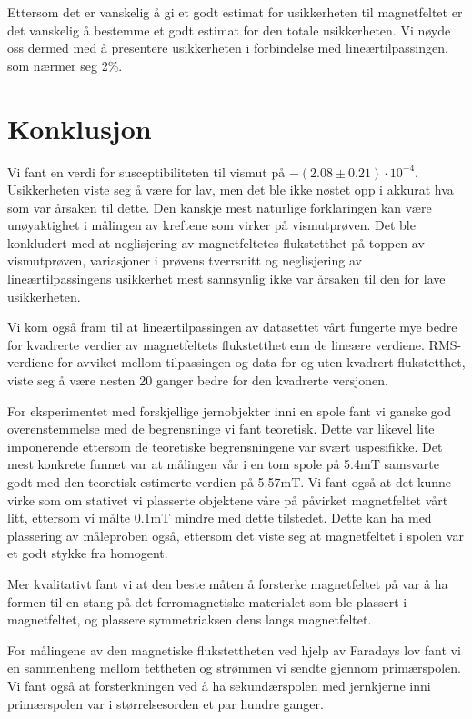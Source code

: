 \documentclass[a4paper,11pt, twocolumn]{article}
\begin{document}
Ettersom det er vanskelig å gi et godt estimat for usikkerheten til magnetfeltet er det vanskelig å bestemme et godt estimat for den totale usikkerheten. Vi nøyde oss dermed med å presentere usikkerheten i forbindelse med lineærtilpassingen, som nærmer seg 2\%. 

\section{Konklusjon}
Vi fant en verdi for susceptibiliteten til vismut på $-(2.08\pm0.21)\cdot10^{-4}$. Usikkerheten viste seg å være for lav, men det ble ikke nøstet opp i akkurat hva som var årsaken til dette. Den kanskje mest naturlige forklaringen kan være unøyaktighet i målingen av kreftene som virker på vismutprøven. Det ble konkludert med at neglisjering av magnetfeltetes flukstetthet på toppen av vismutprøven, variasjoner i prøvens tverrsnitt og neglisjering av lineærtilpassingens usikkerhet mest sannsynlig ikke var årsaken til den for lave usikkerheten.

Vi kom også fram til at lineærtilpassingen av datasettet vårt fungerte mye bedre for kvadrerte verdier av magnetfeltets flukstetthet enn de lineære verdiene. RMS-verdiene for avviket mellom tilpassingen og data for og uten kvadrert flukstetthet, viste seg å være nesten 20 ganger bedre for den kvadrerte versjonen. 

For eksperimentet med forskjellige jernobjekter inni en spole fant vi ganske god overenstemmelse med de begrensninge vi fant teoretisk. Dette var likevel lite imponerende ettersom de teoretiske begrensningene var svært uspesifikke. Det mest konkrete funnet var at målingen vår i en tom spole på 5.4mT samsvarte godt med den teoretisk estimerte verdien på 5.57mT. Vi fant også at det kunne virke som om stativet vi plasserte objektene våre på påvirket magnetfeltet vårt litt, ettersom vi målte 0.1mT mindre med dette tilstedet. Dette kan ha med plassering av måleproben også, ettersom det viste seg at magnetfeltet i spolen var et godt stykke fra homogent.

Mer kvalitativt fant vi at den beste måten å forsterke magnetfeltet på var å ha formen til en stang på det ferromagnetiske materialet som ble plassert i magnetfeltet, og plassere symmetriaksen dens langs magnetfeltet.

For målingene av den magnetiske flukstettheten ved hjelp av Faradays lov fant vi en sammenheng mellom tettheten og strømmen vi sendte gjennom primærspolen. Vi fant også at forsterkningen ved å ha sekundærspolen med jernkjerne inni primærspolen var i størrelsesorden et par hundre ganger.
\end{document}

